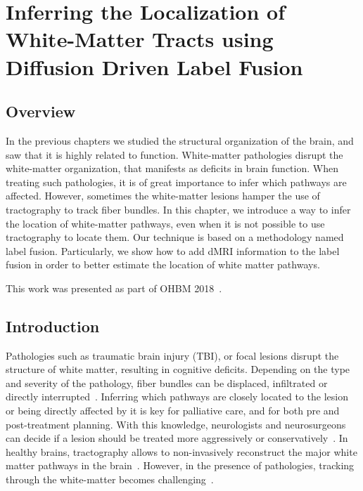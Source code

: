 \chapter{Inferring the Localization of White-Matter Tracts using Diffusion Driven Label Fusion}
\label{ch:multiatlas}

\section{Overview}
In the previous chapters we studied the structural organization of the brain,
and saw that it is highly related to function. White-matter pathologies
disrupt the white-matter organization, that manifests as deficits in brain function. When
treating such pathologies, it is of great importance to infer which pathways are
affected. However, sometimes the white-matter lesions hamper the use of
tractography to track fiber bundles. 
In this chapter, we introduce a way to infer the location of white-matter pathways, even
when it is not possible to use tractography to locate them. Our technique is
based on a methodology named label fusion. Particularly, we show how to add
dMRI information to the label fusion in order to better estimate the location
of white matter pathways.

This work was presented as part of OHBM 2018~\cite{Guillermo2018}.

\section{Introduction}
Pathologies such as traumatic brain injury (TBI), or focal lesions disrupt
the structure of white matter, resulting in cognitive deficits. Depending on
the type and severity of the pathology, fiber bundles can be displaced,
infiltrated or directly interrupted~\cite{Schonberg2006, Huisman2009, Won2016}.
Inferring which pathways are closely located to the lesion or being directly
affected by it is key for palliative care, and for both pre and post-treatment planning.
With this knowledge, neurologists and neurosurgeons can decide if a lesion should be
treated more aggressively or  conservatively~\cite{Huisman2009, McGirt2009}.
In healthy brains, tractography allows to non-invasively reconstruct the major
white matter pathways in the brain~\cite{Catani2008}. However, in the presence of 
pathologies, tracking through the white-matter becomes challenging~\cite{Pictorial2004}.

